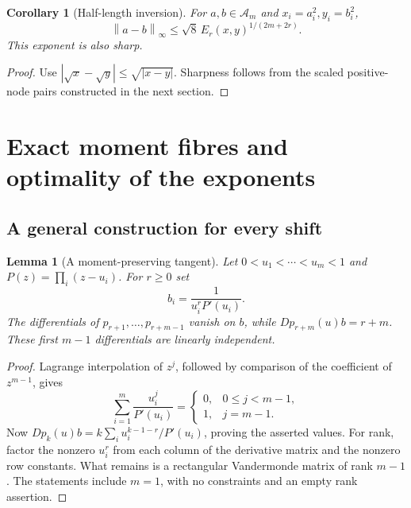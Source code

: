 \documentclass[11pt,a4paper]{article}
\numberwithin{equation}{section}
\newtheorem{lemma}[theorem]{Lemma}
\newtheorem{corollary}[theorem]{Corollary}
\theoremstyle{definition}
\theoremstyle{remark}
\newcommand{\norm}[1]{\left\lVert#1\right\rVert}
\newcommand{\As}{\mathcal A_m}
\begin{document}
\begin{corollary}[Half-length inversion]
\label{cor:half}
For $a,b\in\As$ and $x_i=a_i^2,y_i=b_i^2$,
\begin{equation}
 \norm{a-b}_\infty\le\sqrt8\, E_r(x,y)^{1/(2m+2r)}.
 \label{eq:halfinverse}
\end{equation}
This exponent is also sharp.
\end{corollary}
\begin{proof}
Use $|\sqrt x-\sqrt y|\le\sqrt{|x-y|}$. Sharpness follows from the scaled
positive-node pairs constructed in the next section.
\end{proof}

\section{Exact moment fibres and optimality of the exponents}
\label{sec:fibres}

\subsection{A general construction for every shift}

\begin{lemma}[A moment-preserving tangent]
\label{lem:tangent}
Let $0<u_1<\cdots<u_m<1$ and $P(z)=\prod_i(z-u_i)$. For $r\ge0$ set
\begin{equation}
 b_i=\frac{1}{u_i^rP'(u_i)}.
 \label{eq:tangent}
\end{equation}
The differentials of $p_{r+1},\ldots,p_{r+m-1}$ vanish on $b$, while
$D p_{r+m}(u)b=r+m$. These first $m-1$ differentials are linearly independent.
\end{lemma}
\begin{proof}
Lagrange interpolation of $z^j$, followed by comparison of the coefficient of
$z^{m-1}$, gives
\begin{equation}
 \sum_{i=1}^m\frac{u_i^j}{P'(u_i)}=
 \begin{cases}0,&0\le j<m-1,\\1,&j=m-1.\end{cases}
 \label{eq:lagrange}
\end{equation}
Now $D p_k(u)b=k\sum_i u_i^{k-1-r}/P'(u_i)$, proving the asserted values.
For rank, factor the nonzero $u_i^r$ from each column of the derivative matrix
and the nonzero row constants. What remains is a rectangular Vandermonde
matrix of rank $m-1$. The statements include $m=1$, with no constraints and
an empty rank assertion.
\end{proof}
\end{document}
